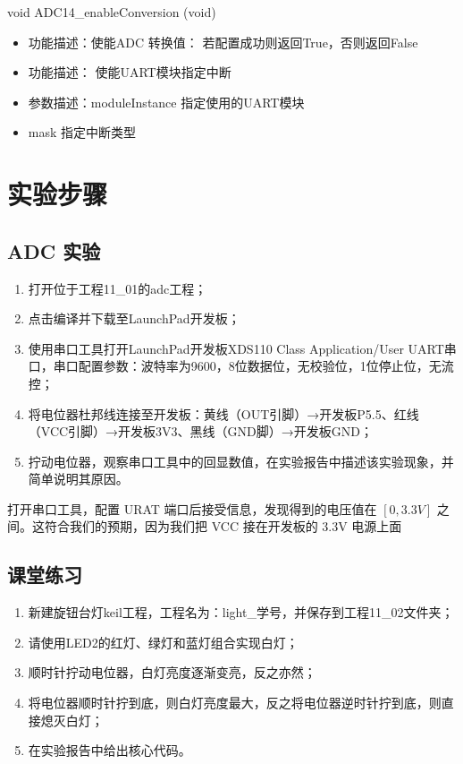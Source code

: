 \documentclass[a4paper,10pt,UTF8]{paper}
\numberwithin{equation}{section}
\numberwithin{figure}{section}
\begin{document}
\begin{ccode}
    void ADC14_enableConversion (void)    
\end{ccode}

\begin{itemize}
    \item 功能描述：使能ADC 转换值： 若配置成功则返回True，否则返回False
\end{itemize}

\begin{itemize}
    \item 功能描述： 使能UART模块指定中断
    \item 参数描述：moduleInstance  指定使用的UART模块
    \item mask      指定中断类型
\end{itemize}

\section{实验步骤}

\subsection{ADC 实验}

\begin{enumerate}
    \item 打开位于工程11\_01的adc工程；
    \item 点击编译并下载至LaunchPad开发板；
    \item 使用串口工具打开LaunchPad开发板XDS110 Class Application/User UART串口，串口配置参数：波特率为9600，8位数据位，无校验位，1位停止位，无流控；
    \item 将电位器杜邦线连接至开发板：黄线（OUT引脚）→开发板P5.5、红线（VCC引脚）→开发板3V3、黑线（GND脚）→开发板GND；
    \item 拧动电位器，观察串口工具中的回显数值，在实验报告中描述该实验现象，并简单说明其原因。
\end{enumerate}

打开串口工具，配置 URAT 端口后接受信息，发现得到的电压值在 $[0,3.3V]$ 之间。这符合我们的预期，因为我们把 VCC 接在开发板的 3.3V 电源上面

\subsection{课堂练习}

\begin{enumerate}
    \item 新建旋钮台灯keil工程，工程名为：light\_学号，并保存到工程11\_02文件夹；
    \item 请使用LED2的红灯、绿灯和蓝灯组合实现白灯；
    \item 顺时针拧动电位器，白灯亮度逐渐变亮，反之亦然；
    \item 将电位器顺时针拧到底，则白灯亮度最大，反之将电位器逆时针拧到底，则直接熄灭白灯；
    \item 在实验报告中给出核心代码。
\end{enumerate}
\end{document}
